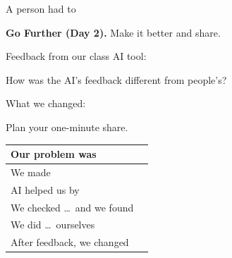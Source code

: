 \documentclass[11pt]{article}
\begin{document}
\vspace{0.6em}
A person had to 

\newpage

{\large\textbf{Go Further (Day 2).}} Make it better and share.

\vspace{0.5em}
Feedback from our class AI tool: 

\vspace{0.6em}
\blank{6.9in}

\vspace{0.7em}
How was the AI's feedback different from people's? 

\vspace{0.5em}

\vspace{0.7em}
What we changed: 

\vspace{1.0em}
Plan your one-minute share.

\vspace{0.3em}
\begin{tabular}{|R{2.2in}|R{4.3in}|}
\hline
Our problem was &  \\[1.3em] \hline
We made & \\[1.3em] \hline
AI helped us by & \\[1.3em] \hline
We checked \dots\ and we found & \\[1.3em] \hline
We did \dots\ ourselves & \\[1.3em] \hline
After feedback, we changed & \\[1.3em] \hline
\end{tabular}
\end{document}
